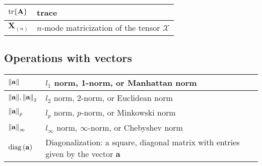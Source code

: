 \begin{xltabular}{\textwidth}{XX}
	\(\tr{\mathbf{A}}\)                                                                                  & trace                                                                                                                                                                           \\ \hline
	\(\mathbf{X}_{(n)}\)                                                                                 & \(n\)-mode matricization of the tensor \(\bm{\mathcal{X}}\)                                                                                                                     \\
\end{xltabular}
\subsection{Operations with vectors}
\begin{xltabular}{\textwidth}{XX}
	\(\norm{\mathbf{a}}\)                      & \(l_1\) norm, 1-norm, or Manhattan norm                                                    \\ \hline
	\(\norm{\mathbf{a}}, \norm{\mathbf{a}}_2\) & \(l_2\) norm, 2-norm, or Euclidean norm                                                    \\ \hline
	\(\norm{\mathbf{a}}_p\)                    & \(l_p\) norm, \(p\)-norm, or Minkowski norm                                                \\ \hline
	\(\norm{\mathbf{a}}_\infty\)               & \(l_\infty\) norm, \(\infty\)-norm, or Chebyshev norm                                      \\ \hline
	\(\operatorname{diag}\left(\mathbf{a}\right)\)                      & Diagonalization: a square, diagonal matrix with entries given by the vector \(\mathbf{a}\) \\
\end{xltabular}

